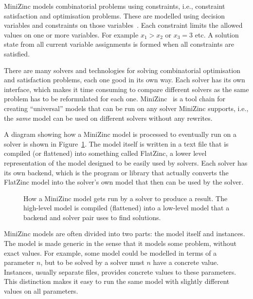 \documentclass[a4paper,12pt]{article}
\begin{document}
MiniZinc models combinatorial problems using constraints, i.e.\@, constraint satisfaction
and optimisation problems. These are modelled using decision variables and
constraints on those variables~\cite{constraintshandbook}. Each constraint limits the
allowed values on one or more variables.
For example $x_1 > x_2$ or $x_3 = 3$ etc.
A solution state from all current variable assignments is formed when all constraints are
satisfied.

There are many solvers and technologies for solving combinatorial optimisation and
satisfaction problems, each one good in its own way. Each solver
has its own interface, which makes it time consuming to compare different
solvers as the same problem has to be reformulated for each one. MiniZinc~\cite{MiniZinc}
is a tool chain for creating ``universal'' models that can be run on any solver MiniZinc
supports, i.e., the \emph{same} model can be used on different solvers without any
rewrites.

A diagram showing how a MiniZinc model is processed to eventually run on a
solver is shown in Figure~\ref{fig:minizinc}. The model itself is written in a text file
that is compiled (or flattened) into something called FlatZinc, a lower level
representation of the model designed to be easily used by solvers. Each
solver has its own backend, which is the program or library that actually converts the
FlatZinc model into the solver's own model that then can be used by the solver.

\begin{figure}[ht]
  \centering
  
  \caption{How a MiniZinc model gets run by a solver to produce a result. The high-level
    model is compiled (flattened) into a low-level model that a backend and solver pair
    uses to find solutions.}%
  \label{fig:minizinc}
\end{figure}

MiniZinc models are often divided into two parts: the model itself and instances. The
model is made generic in the sense that it models some problem, without exact values. For
example, some model could be modelled in terms of a parameter $n$, but to be solved by a
solver must $n$ have a concrete value. Instances, usually separate files, provides
concrete values to these parameters. This distinction makes it easy to run the same model
with slightly different values on all parameters.
\end{document}
